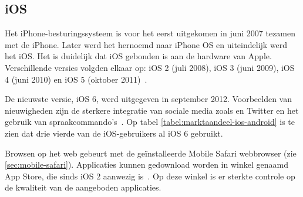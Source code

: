 \begin{table}[t]
\centering
{}
\quad
{}
\caption{Marktaandeel van iOS-versies op 8 mei 2013 en Android-versies op 1 mei 2013.  \protect\cite{Smith2013,Android2013}.}
\label{tabel:marktaandeel-ios-android}
\end{table}

\subsection{iOS}
Het iPhone-besturingssysteem is voor het eerst uitgekomen in juni 2007 tezamen met de iPhone. 
Later werd het hernoemd naar iPhone OS en uiteindelijk werd het iOS. 
Het is duidelijk dat iOS gebonden is aan de hardware van Apple. 
Verschillende versies volgden elkaar op: iOS 2 (juli 2008), iOS 3 (juni 2009), iOS 4 (juni 2010) en iOS 5 (oktober 2011)~\cite{Deitel2012, PhilDutson2012}. 

De nieuwste versie, iOS 6, werd uitgegeven in september 2012. 
Voorbeelden van nieuwigheden zijn de sterkere integratie van sociale media zoals \fb{} en Twitter en het gebruik van spraakcommando's~\cite{Deitel2012}. 
Op tabel \ref{tabel:marktaandeel-ios-android} is te zien dat drie vierde van de iOS-gebruikers al iOS 6 gebruikt.

Browsen op het web gebeurt met de geïnstalleerde Mobile Safari webbrowser (zie \ref{sec:mobile-safari}). Applicaties kunnen gedownload worden in winkel genaamd App Store, die sinds iOS 2 aanwezig is~\cite{Deitel2012}. 
Op deze winkel is er sterkte controle op de kwaliteit van de aangeboden applicaties.

